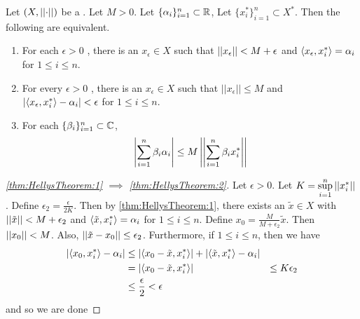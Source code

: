 \begin{thm}
    \label{thm:HellysTheorem}
    Let $(X,\left|\left| \cdot \right|\right|)$ be a \SeminormedSpace.
    Let $M>0$.
    Let $\{\alpha_i\}_{i=1}^n \subset \mathbb{R}$,
    Let $\{x_i^*\}_{i=1}^n \subset X^*$. 
    Then the following are equivalent. 
    \begin{enumerate}[label=(\roman*), ref={\ref{thm:HellysTheorem}~\roman*}]
        \item 
        \label{thm:HellysTheorem:1}
        For each $\epsilon > 0$
        , there is an $x_\epsilon \in X$ 
        such that $\left|\left| x_\epsilon \right|\right|< M+\epsilon$ 
        and $\left\langle x_\epsilon,x_i^* \right\rangle=\alpha_i$ 
        for $1 \leq i \leq n$. 
        \item 
        \label{thm:HellysTheorem:2}
        For every $\epsilon > 0$
        , there is an $x_\epsilon \in X$ 
        such that $||x_\epsilon|| \leq M$ 
        and $\left| \left\langle x_\epsilon,x_i^* \right\rangle-\alpha_i \right|< \epsilon$ 
        for $1 \leq i \leq n$. 
        \item 
        \label{thm:HellysTheorem:3}
        For each $\{\beta_i\}_{i=1}^n \subset \mathbb{C}$, 
        \begin{equation}
            \label{eq:HellysTheorem}
            \left| \sum_{i=1}^n \beta_i \alpha_i \right| \leq M\left|\left| \sum_{i=1}^n \beta_i x_i^* \right|\right|
        \end{equation}
    \end{enumerate}
    \begin{proof}[\ref{thm:HellysTheorem:1} $\implies$ \ref{thm:HellysTheorem:2}]
       Let $\epsilon > 0$. 
       Let $K=\sup\limits_{i=1}^n \left|\left| x_i^* \right|\right|$. 
       Define $\epsilon_2=\frac{\epsilon}{2K}$.
       Then by \ref{thm:HellysTheorem:1}, there exists an $\tilde{x} \in X$ 
       with $\left|\left| \tilde{x} \right|\right| < M+\epsilon_2$ 
       and $\left\langle \tilde{x}, x_i^* \right\rangle = \alpha_i$ for $1 \leq i \leq n$. 
       Define $x_0 = \frac{M}{M+\epsilon_2} \tilde{x}$. 
       Then $\left|\left| x_0 \right|\right| < M$. 
       Also, $\left|\left| \tilde{x}-x_0 \right|\right| \leq \epsilon_2$. 
       Furthermore, if $1 \leq i \leq n$, then we have
       \begin{align*}
       \left| \left\langle x_{0}, x_i^* \right\rangle - \alpha_i \right| & \leq  \left| \left\langle x_0-\tilde{x}, x_i^* \right\rangle \right|+ \left| \left\langle \tilde{x}, x_i^* \right\rangle-\alpha_i \right|\\
       & = \left| \left\langle x_0-\tilde{x}, x_i^* \right\rangle \right|
       & \leq K \epsilon_2\\
       & \leq \frac{\epsilon}{2} < \epsilon
       \end{align*}
       and so we are done

\end{proof}
\end{thm}
